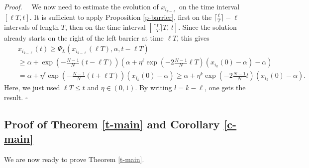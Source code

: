 \documentclass[journal]{article}
\newenvironment{proof}{{\it Proof.}~~}{\hfill$\square$}
\begin{document}
\begin{proof}
We now need to estimate the evolution of $x_{i_{k-\ell}}$ on the time interval $[\ell T,t]$. It is sufficient to apply Proposition \ref{p-barrier}, first on the $\lceil\tfrac{t}{T}\rceil-\ell$ intervals of length $T$, then on the time interval $\left[\lceil\tfrac{t}{T}\rceil T,\,t\right]$. Since the solution already starts on the right of the left barrier at time $\ell T$, this gives
\begin{eqnarray}
&&x_{i_{k-\ell}}(t)\geq \Psi_L(x_{i_{k-\ell}}(\ell T),\alpha,t-\ell T)\nonumber\\
&&\geq \alpha+\exp(-\tfrac{N-1}{N}(t-\ell T))(\alpha+\eta^{\ell}\exp(-2\tfrac{N-1}{N}\ell T)(x_{i_k}(0)-\alpha)-\alpha)\nonumber\\
&&=\alpha+\eta^{\ell}\exp(-\tfrac{N-1}{N}(t+\ell T))(x_{i_k}(0)-\alpha)\geq
\alpha+\eta^k\exp(-2\tfrac{N-1}{N}t)(x_{i_k}(0)-\alpha).\label{e-xid}
\end{eqnarray}
Here, we just used $\ell T\leq t$ and $\eta\in(0,1)$. By writing $l=k-\ell$, one gets the result.
\end{proof}

\subsection{Proof of Theorem \ref{t-main} and Corollary \ref{c-main}} \label{s-proof}
We are now ready to prove Theorem \ref{t-main}.
\end{document}

